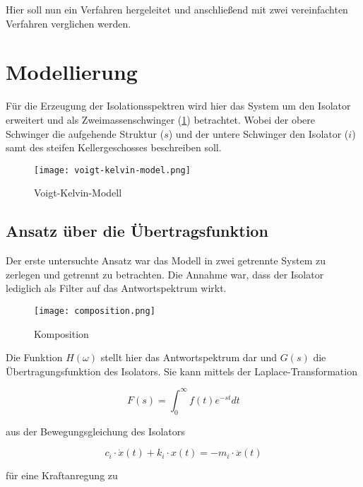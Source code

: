 Hier soll nun ein Verfahren hergeleitet und anschließend mit zwei vereinfachten Verfahren verglichen werden. 

\section{Modellierung}
\label{sec:modellierung}

Für die Erzeugung der Isolationsspektren wird hier das System um den Isolator erweitert und als Zweimassenschwinger (\cref{fig:vkm}) betrachtet.
Wobei der obere Schwinger die aufgehende Struktur ($s$) und der untere Schwinger den Isolator ($i$) samt des steifen Kellergeschosses beschreiben soll.

\begin{figure}[ht]
    \centering
    \texttt{[image: voigt-kelvin-model.png]}
    \caption{Voigt-Kelvin-Modell}
    \label{fig:vkm}
\end{figure}

\subsection{Ansatz über die Übertragsfunktion}
\label{sec:ansatzfunktion}

Der erste untersuchte Ansatz war das Modell in zwei getrennte System zu zerlegen und getrennt zu betrachten.
Die Annahme war, dass der Isolator lediglich als Filter auf das Antwortspektrum wirkt.

\begin{figure}[H]
    \centering
    \texttt{[image: composition.png]}
    \caption{Komposition}
    \label{fig:composition}
\end{figure}

Die Funktion $H(\omega)$ stellt hier das Antwortspektrum dar und $G(s)$ die Übertragungsfunktion des Isolators.
Sie kann mittels der Laplace-Transformation

\begin{equation} \label{laplace}
F(s) = \int_{0}^{\infty} f(t)e^{-st}dt
\end{equation}

aus der Bewegungsgleichung des Isolators \cite{Kramer}

\begin{equation}\label{eq:bewegungsgleichung}
c_i \cdot \dot x(t) + k_i \cdot x(t) = - m_i \cdot \ddot x(t)
\end{equation}

für eine Kraftanregung zu

